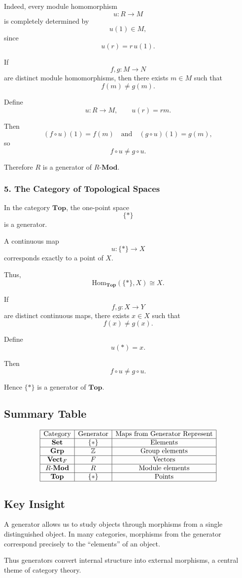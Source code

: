 Indeed, every module homomorphism
\[
u:R\to M
\]
is completely determined by
\[
u(1)\in M,
\]
since
\[
u(r)=r\,u(1).
\]

If
\[
f,g:M\to N
\]
are distinct module homomorphisms, then there exists
$m\in M$ such that
\[
f(m)\neq g(m).
\]

Define
\[
u:R\to M,
\qquad
u(r)=rm.
\]

Then
\[
(f\circ u)(1)=f(m)
\quad\text{and}\quad
(g\circ u)(1)=g(m),
\]
so
\[
f\circ u \neq g\circ u.
\]

Therefore $R$ is a generator of $R\text{-}\mathbf{Mod}$.

\subsubsection*{5. The Category of Topological Spaces}

In the category $\mathbf{Top}$, the one-point space
\[
\{*\}
\]
is a generator.

A continuous map
\[
u:\{*\}\to X
\]
corresponds exactly to a point of $X$.

Thus,
\[
\mathrm{Hom}_{\mathbf{Top}}(\{*\},X)
\cong X.
\]

If
\[
f,g:X\to Y
\]
are distinct continuous maps, there exists
$x\in X$ such that
\[
f(x)\neq g(x).
\]

Define
\[
u(*)=x.
\]

Then
\[
f\circ u \neq g\circ u.
\]

Hence $\{*\}$ is a generator of $\mathbf{Top}$.

\subsection{Summary Table}

\[
\begin{array}{|c|c|c|}
\hline
\text{Category} & \text{Generator} & \text{Maps from Generator Represent} \\
\hline
\mathbf{Set} & \{*\} & \text{Elements} \\
\hline
\mathbf{Grp} & \mathbb Z & \text{Group elements} \\
\hline
\mathbf{Vect}_F & F & \text{Vectors} \\
\hline
R\text{-}\mathbf{Mod} & R & \text{Module elements} \\
\hline
\mathbf{Top} & \{*\} & \text{Points} \\
\hline
\end{array}
\]

\subsection{Key Insight}

A generator allows us to study objects through morphisms from a single
distinguished object. In many categories, morphisms from the generator
correspond precisely to the ``elements'' of an object.

Thus generators convert internal structure into external morphisms, a central
theme of category theory.